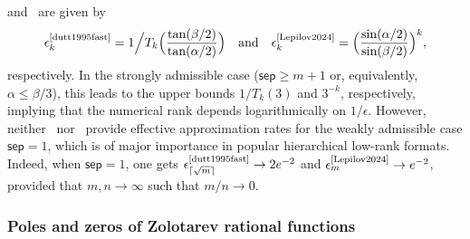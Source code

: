 \documentclass[final,reqno,onefignum,onetabnum]{siamart190516}
\newcommand{\sep}{\mathsf{sep}}
\begin{document}
and~\cite{Lepilov2024} are given by
\[
 \epsilon^{\text{\cite{dutt1995fast}}}_k = 1 \Big/ T_k\Big( \frac{\tan(\beta/2)}{\tan(\alpha/2)} \Big) \quad \text{and} \quad 
 \epsilon^{\text{\cite{Lepilov2024}}}_k = \Big(\frac{\sin(\alpha/2)}{\sin(\beta/2)}  \Big)^k,
\]
respectively. In the strongly admissible case ($\sep \ge m+1$ or, equivalently, $\alpha \le \beta/3$), this leads to the upper bounds
$1/T_k(3)$ and $3^{-k}$, respectively, implying that the numerical rank depends logarithmically on $1/\epsilon$. However, neither~\cite{dutt1995fast,martinsson2005fast}
nor~\cite{Lepilov2024} provide effective approximation rates for the weakly admissible case $\sep = 1$, which is of major importance in popular hierarchical low-rank formats. Indeed, when $\sep = 1$, one gets $\epsilon^{\text{\cite{dutt1995fast}}}_{\lceil \sqrt{m} \rceil} \to 2 e^{-2}$ and $\epsilon^{\text{\cite{Lepilov2024}}}_m \to e^{-2}$, provided that $m,n \to \infty$ such that $m/n \to 0$. 
 

\subsubsection{Poles and zeros of Zolotarev rational functions}
\label{sec:poleszeros}
\end{document}
